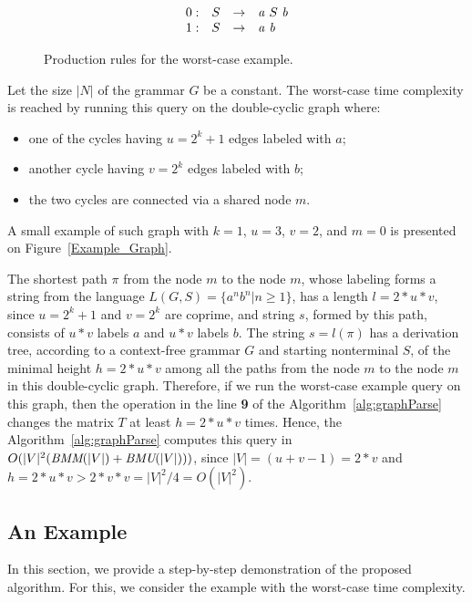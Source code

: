 \begin{figure}[h]
	\[
	\begin{array}{rccl}
	0: & S & \rightarrow & \text{\emph{a}} \ S \ \text{\emph{b}} \\
	1: & S & \rightarrow & \text{\emph{a}} \ \text{\emph{b}} \\ 
	\end{array}
	\]
	\caption{Production rules for the worst-case example.}
	\label{ProductionRulesWorsCaseExample}
\end{figure}

Let the size $|N|$ of the grammar $G$ be a constant. The worst-case time complexity is reached by running this query on the double-cyclic graph where:
\begin{itemize}
	\item one of the cycles having $u = 2^k + 1$ edges labeled with $a$;
	\item another cycle having $v = 2^k$ edges labeled with $b$;
	\item the two cycles are connected via a shared node $m$.
\end{itemize}

A small example of such graph with $k = 1$, $u = 3$, $v = 2$, and $m = 0$ is presented on Figure~\ref{Example_Graph}.

The shortest path $\pi$ from the node $m$ to the node $m$, whose labeling forms a string from the language $L(G,S)=\{a^n b^n| n \geq 1\}$, has a length $l = 2*u*v$, since $u = 2^k + 1$ and $v = 2^k$ are coprime, and string $s$, formed by this path, consists of $u*v$ labels $a$ and $u*v$ labels $b$. The string $s = l(\pi)$ has a derivation tree, according to a context-free grammar $G$ and starting nonterminal $S$, of the minimal height $h = 2*u*v$ among all the paths from the node $m$ to the node $m$ in this double-cyclic graph. Therefore, if we run the worst-case example query on this graph, then the operation in the line \textbf{9} of the Algorithm~\ref{alg:graphParse} changes the matrix $T$ at least $h = 2*u*v$ times. Hence, the Algorithm~\ref{alg:graphParse} computes this query in $O(|V|^2(\text{\it{BMM}}(|V|) + \text{\it{BMU}}(|V|)))$, since $|V| = (u + v - 1) = 2*v$ and $h = 2*u*v > 2*v*v = |V|^2 / 4 = O(|V|^2)$.

\subsection{An Example}
\label{section_example}

In this section, we provide a step-by-step demonstration of the proposed algorithm. For this, we consider the example with the worst-case time complexity.

